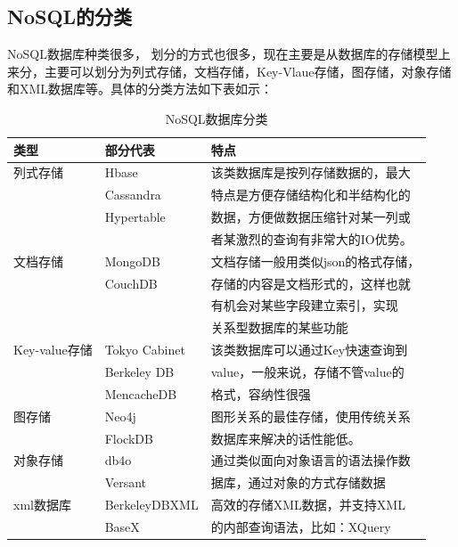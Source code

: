 \documentclass[master]{njnuthesis}
\begin{document}
\subsection{NoSQL的分类}
NoSQL数据库种类很多， 划分的方式也很多，现在主要是从数据库的存储模型上来分，主要可以划分为列式存储，文档存储，Key-Vlaue存储，图存储，对象存储和XML数据库等。具体的分类方法如下表如示：

\begin{table}[!htp]           %
\caption{NoSQL数据库分类}\label{tab:NoSQL_class}
\begin{center}
\begin{tabular}{lll}
\hline
 类型           &  部分代表       &  特点                                \\
\hline
 列式存储       &  Hbase          &  该类数据库是按列存储数据的，最大        \\
                &  Cassandra      &  特点是方便存储结构化和半结构化的        \\
                &  Hypertable     & 数据，方便做数据压缩针对某一列或      \\
                &                 &  者某激烈的查询有非常大的IO优势。    \\
 文档存储       &  MongoDB        &  文档存储一般用类似json的格式存储，  \\
                &  CouchDB        &  存储的内容是文档形式的，这样也就    \\
                &                 &  有机会对某些字段建立索引，实现      \\
                &                 &  关系型数据库的某些功能              \\
 Key-value存储  &  Tokyo Cabinet  &  该类数据库可以通过Key快速查询到     \\
                &  Berkeley DB    &  value，一般来说，存储不管value的    \\
                &  MencacheDB     &  格式，容纳性很强                    \\
 图存储         &  Neo4j          &  图形关系的最佳存储，使用传统关系    \\
                &  FlockDB        &  数据库来解决的话性能低。            \\
 对象存储       &  db4o           &  通过类似面向对象语言的语法操作数  \\
                &  Versant        &  据库，通过对象的方式存储数据          \\
 xml数据库      &  BerkeleyDBXML  &  高效的存储XML数据，并支持XML  \\
                &  BaseX          &  的内部查询语法，比如：XQuery          \\
 \hline
\end{tabular}
\end{center}
\end{table}
\end{document}
